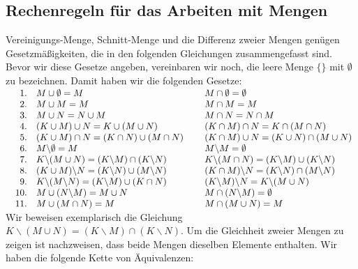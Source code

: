 \subsection{Rechenregeln für das Arbeiten mit Mengen}
 Vereinigungs-Menge,  Schnitt-Menge und die Differenz zweier Mengen genügen Gesetzmäßigkeiten, 
die in den folgenden Gleichungen zusammengefasst sind.  Bevor wir diese Gesetze angeben, vereinbaren wir noch,
die leere Menge $\{\}$ mit $\emptyset$ zu bezeichnen. 
Damit haben wir die folgenden Gesetze:
\\[0.2cm]
$\begin{array}{rlcl}
\quad 1. & M \cup \emptyset = M         & \hspace*{0.1cm} & M \cap \emptyset = \emptyset \\
2. & M \cup M = M         & \hspace*{0.1cm} & M \cap M = M          \\
3. & M \cup N = N \cup M  &  & M \cap N = N \cap M  \\
4. & (K \cup M) \cup N = K \cup (M \cup N) &  & (K \cap M) \cap N = K \cap (M \cap N) \\
5. & (K \cup M) \cap N = (K \cap N) \cup (M \cap N) &  & (K \cap M) \cup N = (K \cup N) \cap (M \cup N)  \\
6. & M \backslash \emptyset = M & & M \backslash M = \emptyset \\
7. & K \backslash (M \cup N) = (K \backslash M) \cap (K \backslash N) &&
     K \backslash (M \cap N) = (K \backslash M) \cup (K \backslash N) \\
8. & (K \cup M) \backslash N = (K \backslash N) \cup (M \backslash N) &&
     (K \cap M) \backslash N = (K \backslash N) \cap (M \backslash N) \\
9. & K \backslash (M \backslash N) = (K \backslash M) \cup (K \cap N) &&
     (K \backslash M) \backslash N = K \backslash (M \cup N) \\
10. & M \cup (N \backslash M) = M \cup N &&
      M \cap (N \backslash M) = \emptyset  \\
11. & M \cup (M \cap N) = M  &&
      M \cap (M \cup N) = M 

\end{array}$
\\[0.3cm]
Wir beweisen exemplarisch die Gleichung $K \backslash (M \cup N) = (K \backslash M) \cap (K \backslash N)$.
Um die Gleichheit zweier Mengen zu zeigen ist nachzweisen, dass beide Mengen dieselben Elemente enthalten.
Wir haben die folgende Kette von Äquivalenzen: \\[0.3cm]
